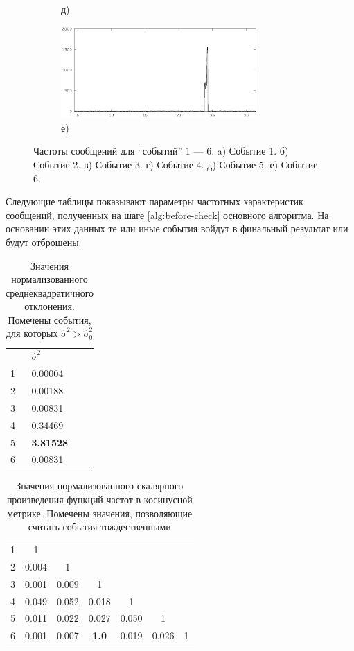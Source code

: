 \documentclass[14pt,a4paper,oneside]{extarticle}
\newcommand\todo[1]{\marginpar{\textcolor{red}{#1}}}
\begin{document}
\begin{figure}[H]
\begin{subfigure}[b]{0.45 \textwidth}
		\caption*{д)}
	\end{subfigure}  
	\begin{subfigure}[b]{0.45 \textwidth}
		\centering
		\includegraphics[width=7.5cm]{all-freq-23-20.eps}	
		\caption*{е)}
	\end{subfigure}  
	
	\caption{Частоты сообщений для ``событий'' 1 --- 6. a) Событие 1. б) Событие 2. в) Событие 3. г) Событие 4. д) Событие 5. е) Событие 6.}
	\end{figure}	  
	  
	Следующие таблицы показывают параметры частотных характеристик сообщений, полученных на шаге \ref{alg:before-check} основного алгоритма. На основании этих данных те или иные события войдут в финальный результат или будут отброшены.
	
	\begin{table}[H]
	\centering
	\caption{Значения нормализованного среднеквадратичного отклонения. Помечены события, для которых  $\hat{\sigma}^2>\hat{\sigma}_0^2$}
	\begin{tabular}{l | l}
	& $\hat{\sigma}^2$ \\ 
	1 & 0.00004 \\ 
	2 & 0.00188 \\ 
	3 & 0.00831 \\ 
	4 & 0.34469 \\ 
	5 & \textbf{3.81528} \\ 
	6 & 0.00831 \\ 
	\end{tabular}
	
	\label{sd-table}
	\end{table}
	
	
	\begin{table}[H]
	\centering
	\caption{Значения нормализованного скалярного произведения функций частот в косинусной метрике. Помечены значения, позволяющие считать события тождественными}
	\begin{tabular}{ r | c  c  c  c  c  c }
		1 & 1 & & & & & \\
		2 & 0.004 & 1 & & & & \\ 
		3 & 0.001 & 0.009 & 1 & & & \\ 
		4 & 0.049 & 0.052 & 0.018 & 1 & & \\
		5 & 0.011 & 0.022 & 0.027 & 0.050 & 1 & \\
		6 & 0.001 & 0.007 & \textbf{1.0} & 0.019 & 0.026 & 1 \\
	\end{tabular}
	
	\label{dotprod-table}
	\end{table}
	
\end{document}
